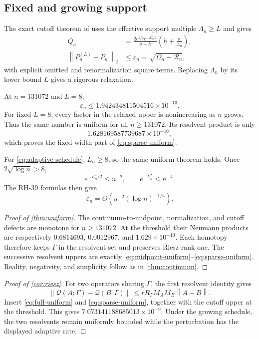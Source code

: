 \documentclass[11pt]{article}
\theoremstyle{definition}
\theoremstyle{remark}
\newcommand{\cQ}{\mathcal Q}
\newcommand{\norm}[1]{\left\lVert #1\right\rVert}
\begin{document}
\subsection{Fixed and growing support}

The exact cutoff theorem of \citet{WangCutoff2026} uses the effective support
multiple $\Lambda_n\ge L$ and gives
\begin{align*}
 Q_n&=
 \frac{2e^{1/2}e^{-\Lambda_n^2/2}}
      {\sigma-h}
 \left(h+\frac{\sigma}{\Lambda_n}\right),\\
 \norm{P_n^{(L)}-P_n}_2
 &\le\varepsilon_n
 =\sqrt{\Omega_n+\mathcal R_n},
\end{align*}
with explicit omitted and renormalization square terms.  Replacing
$\Lambda_n$ by its lower bound $L$ gives a rigorous relaxation.

At $n=131072$ and $L=8$,
\[
 \varepsilon_n
 \le1.942434811504516\times10^{-13}.
\]
For fixed $L=8$, every factor in the relaxed upper is nonincreasing as
$n$ grows.  Thus the same number is uniform for all
$n\ge131072$.  Its resolvent product is only
\[
 1.628169587739687\times10^{-10},
\]
which proves the fixed-width part of \eqref{eq:sparse-uniform}.

For \eqref{eq:adaptive-schedule}, $L_n\ge8$, so the same uniform theorem
holds.  Once $2\sqrt{\log n}>8$,
\[
 e^{-L_n^2/2}\le n^{-2},\qquad
 e^{-L_n^2}\le n^{-4}.
\]
The RH-39 formulas then give
\[
 \varepsilon_n
 =O\!\left(n^{-2}(\log n)^{-1/4}\right).
\]

\begin{proof}[Proof of \cref{thm:uniform}]
The continuum-to-midpoint, normalization, and cutoff defects are monotone
for $n\ge131072$.  At the threshold their Neumann products are respectively
$0.6814693$, $0.0012967$, and
$1.629\times10^{-10}$.  Each homotopy therefore keeps $\Gamma$ in the
resolvent set and preserves Riesz rank one.  The successive resolvent
uppers are exactly \eqref{eq:midpoint-uniform}--\eqref{eq:sparse-uniform}.
Reality, negativity, and simplicity follow as in
\cref{thm:continuum}.
\end{proof}

\begin{proof}[Proof of \cref{cor:riesz}]
For two operators sharing $\Gamma$, the first resolvent identity gives
\[
 \norm{\cQ(A;\Gamma)-\cQ(B;\Gamma)}
 \le
 rR_\Gamma M_AM_B\norm{A-B}.
\]
Insert \eqref{eq:full-uniform} and \eqref{eq:sparse-uniform}, together with
the cutoff upper at the
threshold.  This gives $7.073141188685013\times10^{-9}$.  Under the growing
schedule, the two resolvents remain uniformly bounded while the perturbation
has the displayed adaptive rate.
\end{proof}
\end{document}
